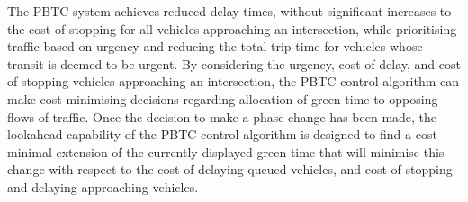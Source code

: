 The PBTC system achieves reduced delay times, without significant increases to the cost of stopping for all vehicles approaching an intersection, while prioritising traffic based on urgency and reducing the total trip time for vehicles whose transit is deemed to be urgent. By considering the urgency, cost of delay, and cost of stopping vehicles approaching an intersection, the PBTC control algorithm can make cost-minimising decisions regarding allocation of green time to opposing flows of traffic. Once the decision to make a phase change has been made, the lookahead capability of the PBTC control algorithm is designed to find a cost-minimal extension of the currently displayed green time that will minimise this change with respect to the cost of delaying queued vehicles, and cost of stopping and delaying approaching vehicles.
